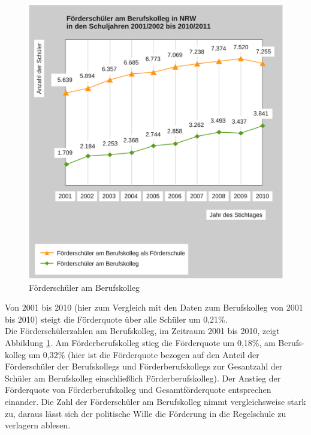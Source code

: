 \begin{figure}[htbp]
\centering
\includegraphics[width=\ScaleIfNeeded]{nrw02.pdf}%
\caption{Förderschüler am Berufskolleg}%
\label{NRW02}
\end{figure}

Von 2001 bis 2010 (hier zum Vergleich mit den Daten zum Berufskolleg von 2001 bis 2010) steigt die Förder­quote über alle Schüler um 0,21\%.\\
Die Förderschülerzahlen am Berufs­kolleg, im Zeitraum 2001 bis 2010, zeigt Abbildung \ref{NRW02}. Am Förderberufs­kolleg stieg die Förderquote um 0,18\%, am Berufs­kolleg um 0,32\% (hier ist die Förderquote bezogen auf den Anteil der Förderschüler der Berufskollegs und Förderberufskollegs zur Gesantzahl der Schüler am Berufskolleg einschließlich Förderberufskolleg). Der Anstieg der Förderquote von Förderberufskolleg und Gesamtförderquote entsprechen einander. Die Zahl der Förderschüler am Berufskolleg nimmt vergleichsweise stark zu, daraus lässt sich der politische Wille die Förderung in die Regelschule zu verlagern ablesen.

